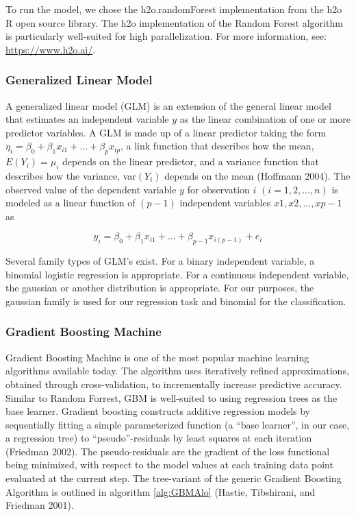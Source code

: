 \documentclass[12pt,]{article}
\begin{document}
To run the model, we chose the h2o.randomForest implementation from the
h2o R open source library. The h2o implementation of the Random Forest
algorithm is particularly well-suited for high parallelization. For more
information, see: \url{https://www.h2o.ai/}.

\hypertarget{generalized-linear-model}{%
\subsubsection{Generalized Linear
Model}\label{generalized-linear-model}}

A generalized linear model (GLM) is an extension of the general linear
model that estimates an independent variable \(y\) as the linear
combination of one or more predictor variables. A GLM is made up of a
linear predictor taking the form
\(\eta_i = \beta_0+\beta_1x_{i1}+...+\beta_{p}x_{ip}\), a link function
that describes how the mean, \(E(Y_i)=\mu_i\) depends on the linear
predictor, and a variance function that describes how the variance,
var\((Y_i)\) depends on the mean (Hoffmann 2004). The observed value of
the dependent variable \(y\) for observation \(i\)
\((i = 1, 2, ..., n)\) is modeled as a linear function of \((p - 1)\)
independent variables \(x1, x2,... ,xp-1\) as

\[
y_i = \beta_0+\beta_1x_{i1}+...+\beta_{p-1}x_{i(p-1)}+e_i
\]

Several family types of GLM's exist. For a binary independent variable,
a binomial logistic regression is appropriate. For a continuous
independent variable, the gaussian or another distribution is
appropriate. For our purposes, the gaussian family is used for our
regression task and binomial for the classification.

\hypertarget{gradient-boosting-machine}{%
\subsubsection{Gradient Boosting
Machine}\label{gradient-boosting-machine}}

Gradient Boosting Machine is one of the most popular machine learning
algorithms available today. The algorithm uses iteratively refined
approximations, obtained through cross-validation, to incrementally
increase predictive accuracy. Similar to Random Forrest, GBM is
well-suited to using regression trees as the base learner. Gradient
boosting constructs additive regression models by sequentially fitting a
simple parameterized function (a ``base learner'', in our case, a
regression tree) to ``pseudo''-residuals by least squares at each
iteration (Friedman 2002). The pseudo-residuals are the gradient of the
loss functional being minimized, with respect to the model values at
each training data point evaluated at the current step. The tree-variant
of the generic Gradient Boosting Algorithm is outlined in algorithm
\ref{alg:GBMAlo} (Hastie, Tibshirani, and Friedman 2001).
\end{document}

